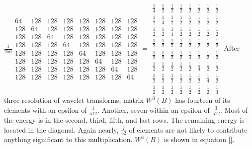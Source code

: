 \documentclass{article}
\begin{document}
$\frac{1}{256} 
\begin{array}{cccccccc}
64 & 128 & 128 & 128 & 128 & 128 & 128 & 128 \\ 
128 & 64 & 128 & 128 & 128 & 128 & 128 & 128 \\ 
128 & 128 & 64 & 128 & 128 & 128 & 128 & 128 \\ 
128 & 128 & 128 & 64 & 128 & 128 & 128 & 128 \\ 
128 & 128 & 128 & 128 & 64 & 128 & 128 & 128 \\ 
128 & 128 & 128 & 128 & 128 & 64 & 128 & 128 \\ 
128 & 128 & 128 & 128 & 128 & 128 & 64 & 128 \\ 
128 & 128 & 128 & 128 & 128 & 128 & 128 & 64
\end{array}
=\allowbreak 
\begin{array}{cccccccc}
\frac{1}{4} & \frac{1}{2} & \frac{1}{2} & \frac{1}{2} & \frac{1}{2} & \frac{1%
}{2} & \frac{1}{2} & \frac{1}{2} \\ 
\frac{1}{2} & \frac{1}{4} & \frac{1}{2} & \frac{1}{2} & \frac{1}{2} & \frac{1%
}{2} & \frac{1}{2} & \frac{1}{2} \\ 
\frac{1}{2} & \frac{1}{2} & \frac{1}{4} & \frac{1}{2} & \frac{1}{2} & \frac{1%
}{2} & \frac{1}{2} & \frac{1}{2} \\ 
\frac{1}{2} & \frac{1}{2} & \frac{1}{2} & \frac{1}{4} & \frac{1}{2} & \frac{1%
}{2} & \frac{1}{2} & \frac{1}{2} \\ 
\frac{1}{2} & \frac{1}{2} & \frac{1}{2} & \frac{1}{2} & \frac{1}{4} & \frac{1%
}{2} & \frac{1}{2} & \frac{1}{2} \\ 
\frac{1}{2} & \frac{1}{2} & \frac{1}{2} & \frac{1}{2} & \frac{1}{2} & \frac{1%
}{4} & \frac{1}{2} & \frac{1}{2} \\ 
\frac{1}{2} & \frac{1}{2} & \frac{1}{2} & \frac{1}{2} & \frac{1}{2} & \frac{1%
}{2} & \frac{1}{4} & \frac{1}{2} \\ 
\frac{1}{2} & \frac{1}{2} & \frac{1}{2} & \frac{1}{2} & \frac{1}{2} & \frac{1%
}{2} & \frac{1}{2} & \frac{1}{4}
\end{array}
\allowbreak $
After three resolution of wavelet transforms, matrix $W^3(B)$ has fourteen of its elements with an epsilon of $\frac{1}{512}$.  Another, seven within an epsilon of $\frac{3}{512}$.  Most of the energy is in the second, third, fifth, and last rows.   The remaining energy is located in the diagonal.  Again nearly, $\frac{7}{32}$ of elements are not likely to contribute anything significant to this multiplication.    $W^3(B)$ is shown in equation \ref{}.  
\end{document}
